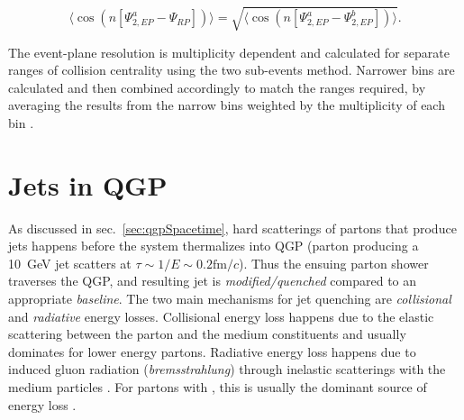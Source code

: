 \begin{equation}
	\langle \cos(n[\Psi_{2, EP}^{a} - \Psi_{RP}]) \rangle = 
	\sqrt{\langle \cos(n[\Psi_{2, EP}^{a} - \Psi_{2, EP}^{b}]) \rangle} .
	\label{resolutionIndiv}
\end{equation}

The event-plane resolution is multiplicity dependent and calculated for separate ranges of collision centrality using the two sub-events method.  
%
Narrower bins are calculated and then combined accordingly to match the ranges required, by averaging the results from the narrow bins weighted by the multiplicity of each bin \cite{Voloshin:2008dg}.

\section{Jets in QGP}
As discussed in sec.~\ref{sec:qgpSpacetime}, hard scatterings of partons that produce jets happens before the system thermalizes into QGP (parton producing a 10~GeV jet scatters at \(\tau \sim 1/E \sim 0.2\text{fm}/c\)). 
%
Thus the ensuing parton shower traverses the QGP, and resulting jet is \emph{modified/quenched} compared to an appropriate \emph{baseline}. 
%
The two main mechanisms for jet quenching are \emph{collisional} and \emph{radiative} energy losses. 
%
Collisional energy loss happens due to the elastic scattering between the parton and the medium constituents and usually dominates for lower energy partons. 
%
Radiative energy loss happens due to induced gluon radiation (\textit{bremsstrahlung}) through inelastic scatterings with the medium particles \cite{MAJUMDER201141,QinWang2024,Burkeetal}. 
%
For partons with  , this is usually the dominant source of energy loss \cite{LandoltBornstein2010:sm_lbs_978-3-642-01539-7_16}. 
%
%

